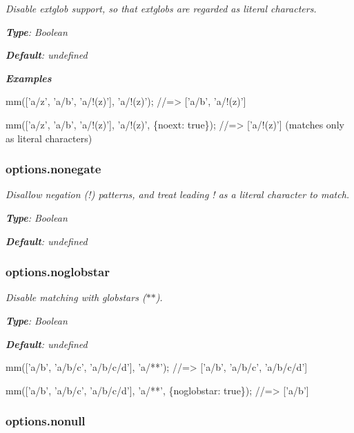 {\itshape }

{\itshape Disable extglob support, so that extglobs are regarded as literal characters.}

{\itshape {\bfseries Type}\+: {\ttfamily Boolean}}

{\itshape {\bfseries Default}\+: {\ttfamily undefined}}

{\itshape {\bfseries Examples}}

{\itshape 
\begin{DoxyCode}
mm(['a/z', 'a/b', 'a/!(z)'], 'a/!(z)');
//=> ['a/b', 'a/!(z)']

mm(['a/z', 'a/b', 'a/!(z)'], 'a/!(z)', \{noext: true\});
//=> ['a/!(z)'] (matches only as literal characters)
\end{DoxyCode}
}

{\itshape \subsubsection*{options.\+nonegate}}

{\itshape }

{\itshape Disallow negation ({\ttfamily !}) patterns, and treat leading {\ttfamily !} as a literal character to match.}

{\itshape {\bfseries Type}\+: {\ttfamily Boolean}}

{\itshape {\bfseries Default}\+: {\ttfamily undefined}}

{\itshape \subsubsection*{options.\+noglobstar}}

{\itshape }

{\itshape Disable matching with globstars ({\ttfamily $\ast$$\ast$}).}

{\itshape {\bfseries Type}\+: {\ttfamily Boolean}}

{\itshape {\bfseries Default}\+: {\ttfamily undefined}}

{\itshape 
\begin{DoxyCode}
mm(['a/b', 'a/b/c', 'a/b/c/d'], 'a/**');
//=> ['a/b', 'a/b/c', 'a/b/c/d']

mm(['a/b', 'a/b/c', 'a/b/c/d'], 'a/**', \{noglobstar: true\});
//=> ['a/b']
\end{DoxyCode}
}

{\itshape \subsubsection*{options.\+nonull}}

